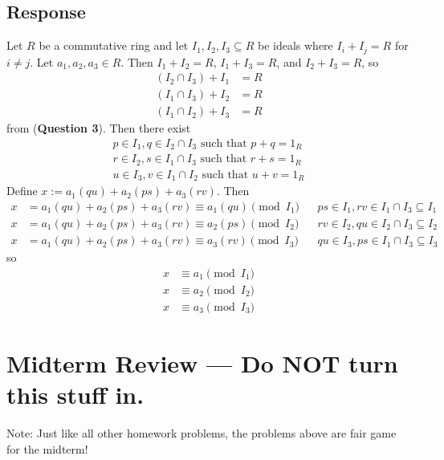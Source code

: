 \documentclass [12pt] {article}
\renewcommand{\bf}[1]{\textbf{{#1}}}
\begin{document}
\subsection*{Response}
Let $R$ be a commutative ring and let $I_1, I_2, I_3 \subseteq R$ be ideals where 
$I_i + I_j = R$ for $i \neq j$. Let $a_1, a_2, a_3 \in R$.
Then $I_1 + I_2 = R$, $I_1 + I_3 = R$, and $I_2 + I_3 = R$, so 
\begin{align*}
    (I_2 \cap I_3) + I_1 &= R \\
    (I_1 \cap I_3) + I_2 &= R \\
    (I_1 \cap I_2) + I_3 &= R
\end{align*}
from (\bf{Question 3}).
Then there exist 
\begin{align*}
    p \in I_1, q \in I_2 \cap I_3 \text{ such that } p + q = 1_R \\
    r \in I_2, s \in I_1 \cap I_3 \text{ such that } r + s = 1_R \\
    u \in I_3, v \in I_1 \cap I_2 \text{ such that } u + v = 1_R
\end{align*}
Define
$x := a_1(qu) + a_2(ps) + a_3(rv)$. Then
\begin{align*}
    x &= a_1(qu) + a_2(ps) + a_3(rv) 
    \equiv a_1(qu) \pmod{I_1} && ps \in I_1, rv \in I_1 \cap I_3 \subseteq I_1 \\
    x &= a_1(qu) + a_2(ps) + a_3(rv) 
    \equiv a_2(ps) \pmod{I_2} && rv \in I_2, qu \in I_2 \cap I_3 \subseteq I_2 \\
    x &= a_1(qu) + a_2(ps) + a_3(rv) 
    \equiv a_3(rv) \pmod{I_3} && qu \in I_3, ps \in I_1 \cap I_3 \subseteq I_3
\end{align*}
so
\begin{align*}
      x &\equiv a_1 \pmod{I_1} \\
      x &\equiv a_2 \pmod{I_2} \\
      x &\equiv a_3 \pmod{I_3}
\end{align*}

\newpage
\section{Midterm Review --- Do NOT turn this stuff in.}

Note: Just like all other homework problems, the problems above are fair game for the midterm! 
\end{document}
